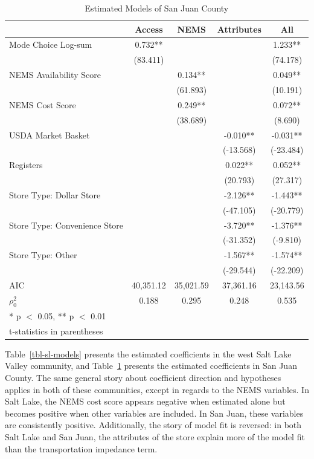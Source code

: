 \documentclass[
  letterpaper,
  authoryear,
  review,
  3p]{elsarticle}
\begin{document}
\hypertarget{tbl-sj-models}{}
\begin{table}
\caption{\label{tbl-sj-models}Estimated Models of San Juan County }\tabularnewline

\centering
\begin{tabular}[t]{lcccc}
\toprule
  & Access & NEMS & Attributes & All\\
\midrule
Mode Choice Log-sum & 0.732** &  &  & 1.233**\\
 & (83.411) &  &  & (74.178)\\
NEMS Availability Score &  & 0.134** &  & 0.049**\\
 &  & (61.893) &  & (10.191)\\
NEMS Cost Score &  & 0.249** &  & 0.072**\\
 &  & (38.689) &  & (8.690)\\
USDA Market Basket &  &  & -0.010** & -0.031**\\
 &  &  & (-13.568) & (-23.484)\\
Registers &  &  & 0.022** & 0.052**\\
 &  &  & (20.793) & (27.317)\\
Store Type: Dollar Store &  &  & -2.126** & -1.443**\\
 &  &  & (-47.105) & (-20.779)\\
Store Type: Convenience Store &  &  & -3.720** & -1.376**\\
 &  &  & (-31.352) & (-9.810)\\
Store Type: Other &  &  & -1.567** & -1.574**\\
 &  &  & (-29.544) & (-22.209)\\
\midrule
AIC & 40,351.12 & 35,021.59 & 37,361.16 & 23,143.56\\
$\rho^2_0$ & 0.188 & 0.295 & 0.248 & 0.535\\
\bottomrule
\multicolumn{5}{l}{\rule{0pt}{1em}* p $<$ 0.05, ** p $<$ 0.01}\\
\multicolumn{5}{l}{\rule{0pt}{1em}t-statistics in parentheses}\\
\end{tabular}
\end{table}

Table~\ref{tbl-sl-models} presents the estimated coefficients in the
west Salt Lake Valley community, and Table~\ref{tbl-sj-models} presents
the estimated coefficients in San Juan County. The same general story
about coefficient direction and hypotheses applies in both of these
communities, except in regards to the NEMS variables. In Salt Lake, the
NEMS cost score appears negative when estimated alone but becomes
positive when other variables are included. In San Juan, these variables
are consistently positive. Additionally, the story of model fit is
reversed: in both Salt Lake and San Juan, the attributes of the store
explain more of the model fit than the transportation impedance term.
\end{document}
